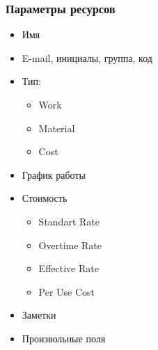 \documentclass[a4paper, 14pt]{extarticle}
\begin{document}
\subsubsection{Параметры ресурсов}
\begin{itemize}
    \item Имя
    \item E-mail, инициалы, группа, код
    \item Тип:
    \begin{itemize}
        \item Work
        \item Material
        \item Cost
    \end{itemize}
    \item График работы
    \item Стоимость
    \begin{itemize}
        \item Standart Rate
        \item Overtime Rate
        \item Effective Rate
        \item Per Use Cost
    \end{itemize}
    \item Заметки
    \item Произвольные поля
\end{itemize}
\end{document}
